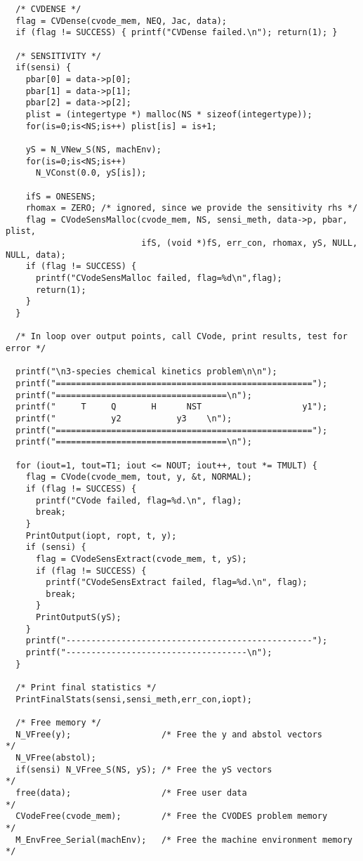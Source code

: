 \begin{verbatim}
  /* CVDENSE */
  flag = CVDense(cvode_mem, NEQ, Jac, data);
  if (flag != SUCCESS) { printf("CVDense failed.\n"); return(1); }

  /* SENSITIVITY */
  if(sensi) {
    pbar[0] = data->p[0];
    pbar[1] = data->p[1];
    pbar[2] = data->p[2];
    plist = (integertype *) malloc(NS * sizeof(integertype));
    for(is=0;is<NS;is++) plist[is] = is+1;

    yS = N_VNew_S(NS, machEnv);
    for(is=0;is<NS;is++)
      N_VConst(0.0, yS[is]);

    ifS = ONESENS;
    rhomax = ZERO; /* ignored, since we provide the sensitivity rhs */
    flag = CVodeSensMalloc(cvode_mem, NS, sensi_meth, data->p, pbar, plist,
                           ifS, (void *)fS, err_con, rhomax, yS, NULL, NULL, data);
    if (flag != SUCCESS) {
      printf("CVodeSensMalloc failed, flag=%d\n",flag);
      return(1);
    }
  }
  
  /* In loop over output points, call CVode, print results, test for error */

  printf("\n3-species chemical kinetics problem\n\n");
  printf("===================================================");
  printf("==================================\n");
  printf("     T     Q       H      NST                    y1");
  printf("           y2           y3    \n");
  printf("===================================================");
  printf("==================================\n");

  for (iout=1, tout=T1; iout <= NOUT; iout++, tout *= TMULT) {
    flag = CVode(cvode_mem, tout, y, &t, NORMAL);
    if (flag != SUCCESS) {
      printf("CVode failed, flag=%d.\n", flag); 
      break; 
    }
    PrintOutput(iopt, ropt, t, y);
    if (sensi) {
      flag = CVodeSensExtract(cvode_mem, t, yS);
      if (flag != SUCCESS) { 
        printf("CVodeSensExtract failed, flag=%d.\n", flag); 
        break; 
      }
      PrintOutputS(yS);
    } 
    printf("-------------------------------------------------");
    printf("------------------------------------\n");
  }

  /* Print final statistics */
  PrintFinalStats(sensi,sensi_meth,err_con,iopt);

  /* Free memory */
  N_VFree(y);                  /* Free the y and abstol vectors       */
  N_VFree(abstol);   
  if(sensi) N_VFree_S(NS, yS); /* Free the yS vectors                 */
  free(data);                  /* Free user data                      */
  CVodeFree(cvode_mem);        /* Free the CVODES problem memory      */
  M_EnvFree_Serial(machEnv);   /* Free the machine environment memory */


\end{verbatim}

